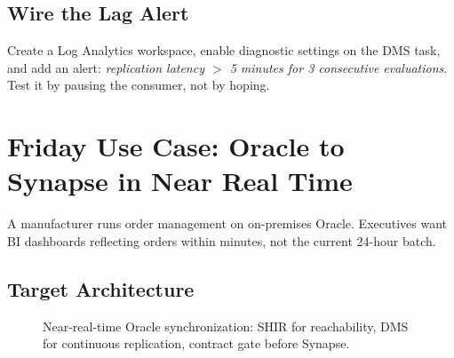 \subsection{Wire the Lag Alert}
Create a Log Analytics workspace, enable diagnostic settings on the DMS task, and add an alert: \emph{replication latency $>$ 5 minutes for 3 consecutive evaluations}. Test it by pausing the consumer, not by hoping.

\section{Friday Use Case: Oracle to Synapse in Near Real Time}
A manufacturer runs order management on on-premises Oracle. Executives want BI dashboards reflecting orders within minutes, not the current 24-hour batch.

\subsection{Target Architecture}
\begin{figure}[H]
    \centering
    \caption{Near-real-time Oracle synchronization: SHIR for reachability, DMS for continuous replication, contract gate before Synapse.}
    \label{fig:ch11-oracle-sync}
\end{figure}

